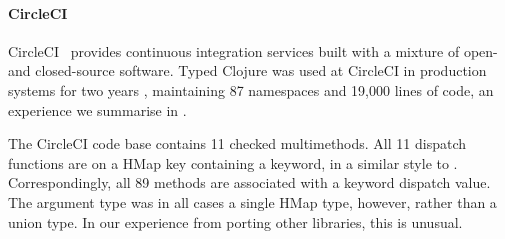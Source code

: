 \documentclass[9pt]{extarticle}
\begin{document}
\paragraph{CircleCI}
CircleCI~\cite{CircleCI}
provides continuous integration services built with a mixture of open-
and closed-source software.
Typed Clojure was used at CircleCI in production systems for two years \cite{CircleCIUsesTC},
maintaining
87 namespaces and 19,000 lines of code,
an experience we summarise in .
%
%

%
%
%

The CircleCI code base contains 11 checked multimethods.
 All 11 dispatch functions
are on a HMap key containing a keyword, in a similar style to
.
Correspondingly, all 89 methods are associated with a keyword dispatch value.
The argument type was in all cases a single HMap type, however,
rather than a union type.
In our experience from porting other libraries, this is unusual.
\end{document}
